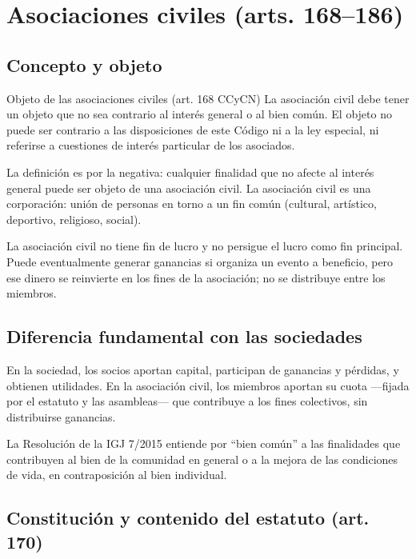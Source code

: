 \documentclass[12pt,oneside]{book}
\begin{document}
\section{Asociaciones civiles (arts. 168--186)}

\subsection{Concepto y objeto}

\begin{definition}{Objeto de las asociaciones civiles (art. 168 CCyCN)}
La asociación civil debe tener un objeto que no sea contrario al interés general o al bien común. El objeto no puede ser contrario a las disposiciones de este Código ni a la ley especial, ni referirse a cuestiones de interés particular de los asociados.
\end{definition}

La definición es por la negativa: cualquier finalidad que no afecte al interés general puede ser objeto de una asociación civil. La asociación civil es una corporación: unión de personas en torno a un fin común (cultural, artístico, deportivo, religioso, social).

\begin{important}
La asociación civil no tiene fin de lucro y no persigue el lucro como fin principal. Puede eventualmente generar ganancias si organiza un evento a beneficio, pero ese dinero se reinvierte en los fines de la asociación; no se distribuye entre los miembros.
\end{important}

\subsection{Diferencia fundamental con las sociedades}

En la sociedad, los socios aportan capital, participan de ganancias y pérdidas, y obtienen utilidades. En la asociación civil, los miembros aportan su cuota —fijada por el estatuto y las asambleas— que contribuye a los fines colectivos, sin distribuirse ganancias.

\begin{note}
La Resolución de la IGJ 7/2015 entiende por ``bien común'' a las finalidades que contribuyen al bien de la comunidad en general o a la mejora de las condiciones de vida, en contraposición al bien individual.
\end{note}

\subsection{Constitución y contenido del estatuto (art. 170)}
\end{document}
